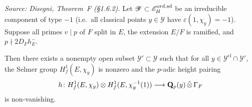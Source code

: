 \begin{theorem}
  \label{thm:TheoremF}
%
  \textit{Source: Disegni, Theorem~F (§1.6.2).}
  Let $\mathscr{Y} \subset \mathscr{E}^{\mathrm{ord},\mathrm{sd}}_H$ be an irreducible
  component of type $-1$ (i.e.\ all classical points $y \in \mathscr{Y}$
  have $\varepsilon(1, \chi_y) = -1$).  Suppose all primes $v \mid p$
  of $F$ split in $E$, the extension $E/F$ is ramified, and
  $p \nmid 2 D_F h_E^-$.

  Then there exists a nonempty open subset $\mathscr{Y}' \subset
  \mathscr{Y}$ such that for all $y \in \mathscr{Y}^{\mathrm{cl}}
  \cap \mathscr{Y}'$, the Selmer group $H^1_f(E, \chi_y)$ is nonzero
  and the $p$-adic height pairing
  \[
    h \colon H^1_f(E, \chi_y) \otimes H^1_f(E, \chi_y^{-1}(1))
    \longrightarrow \mathbf{Q}_p(y)\,\hat\otimes\,\Gamma_F
  \]
  is non-vanishing.
\end{theorem}

